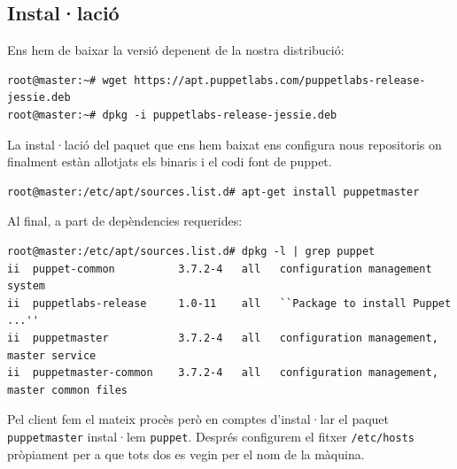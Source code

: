 \documentclass[a4paper]{article}
\begin{document}

\subsection{Instal·lació}
Ens hem de baixar la versió depenent de la nostra distribució:
\begin{verbatim}
root@master:~# wget https://apt.puppetlabs.com/puppetlabs-release-jessie.deb
root@master:~# dpkg -i puppetlabs-release-jessie.deb
\end{verbatim}
La instal·lació del paquet que ens hem baixat ens configura nous repositoris on finalment estàn allotjats els binaris i el codi font de puppet.
\begin{verbatim}
root@master:/etc/apt/sources.list.d# apt-get install puppetmaster
\end{verbatim}
Al final, a part de depèndencies requerides:
\begin{verbatim}
root@master:/etc/apt/sources.list.d# dpkg -l | grep puppet
ii  puppet-common          3.7.2-4   all   configuration management system
ii  puppetlabs-release     1.0-11    all   ``Package to install Puppet ...''
ii  puppetmaster           3.7.2-4   all   configuration management, master service
ii  puppetmaster-common    3.7.2-4   all   configuration management, master common files
\end{verbatim}
Pel client fem el mateix procès però en comptes d'instal·lar el paquet \verb+puppetmaster+ instal·lem \verb+puppet+. Despr\'es configurem el fitxer \verb+/etc/hosts+ pròpiament per a que tots dos es vegin per el nom de la màquina.
\end{document}
